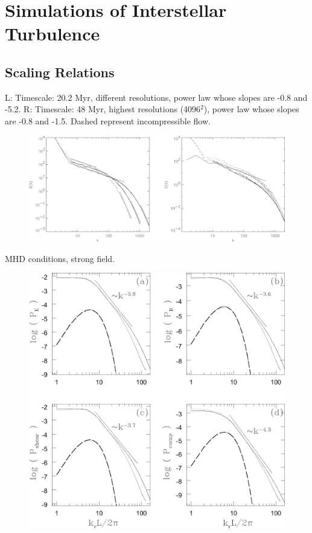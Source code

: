 \documentclass[12pt]{article}
\begin{document}
\clearpage
\section{Simulations of Interstellar Turbulence} %
\label{sec:simulations_of_interstellar_turbulence}
    \subsection{Scaling Relations} %
    \label{sub:scaling_relations}
    L: Timescale: 20.2 Myr, different resolutions, power law whose slopes are -0.8 and -5.2.
    R: Timescale: 48 Myr, highest resolutions (4096$^{2}$), power law whose slopes are -0.8 and -1.5. Dashed represent incompressible flow. \cite{2002ApJ...577..197W}
        \begin{figure}[hb]
                  \centering
                  \includegraphics[totalheight=50 mm]{img/Wada.eps}
        \end{figure} 
    \clearpage
    MHD conditions, strong field. \cite{2003ApJ...590..858V}
        \begin{figure}[hb]
                  \centering
                  \includegraphics[totalheight=80 mm]{img/Vestuto_strongfield.eps}
        \end{figure} 
\end{document}
